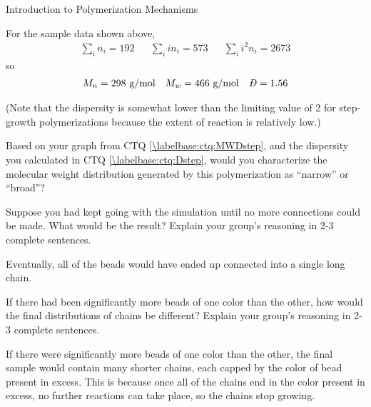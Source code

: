 \begin{activity}{Introduction to Polymerization Mechanisms}
\begin{ctqs}
\begin{solution}[3in]
{			For the sample data shown above,
			\begin{align*}
				\sum_i n_i = 192 && \sum_i i n_i = 573 && \sum_i i^2 n_i = 2673
			\end{align*}
			so
			\begin{align*}
				M_n = 298\text{ g/mol} && M_w = 466\text{ g/mol} && \PDImath = 1.56
			\end{align*}
			
			(Note that the dispersity is somewhat lower than the limiting value of 2 for step-growth polymerizations because the extent of reaction is relatively low.)
		}\end{solution}
	
	\question Based on your graph from CTQ \ref{\labelbase:ctq:MWDstep}, and the dispersity you calculated in CTQ \ref{\labelbase:ctq:Dstep}, would you characterize the molecular weight distribution generated by this polymerization as ``narrow'' or ``broad''?  %
	
		\begin{solution}[1in]\end{solution}
	
	\question Suppose you had kept going with the simulation until no more  connections could be made.  What would be the result?  Explain your group's reasoning in 2-3 complete sentences.
	
		\begin{solution}[1.75in]
			Eventually, all of the beads would have ended up connected into a single long chain.
		\end{solution}
	
	\question If there had been significantly more beads of one color than the other, how would the final distributions of chains be different?  Explain your group's reasoning in 2-3 complete sentences.
	
		\begin{solution}[1.75in]
			If there were significantly more beads of one color than the other, the final sample would contain many shorter chains, each capped by the color of bead present in excess.  This is because once all of the chains end in the color present in excess, no further reactions can take place, so the chains stop growing.
		\end{solution}
	

\end{ctqs}
\end{activity}
